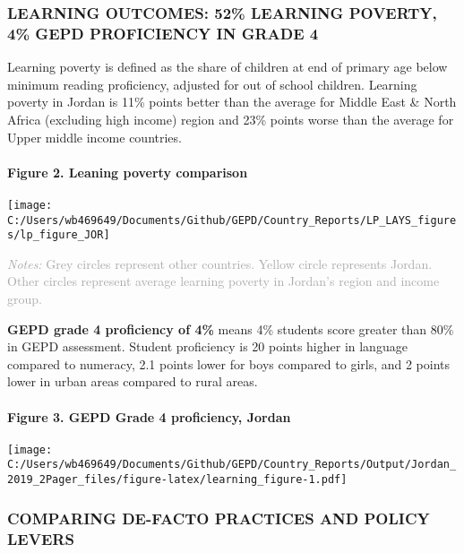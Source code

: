\documentclass[
  twocolumn]{article}
\begin{document}
\hypertarget{learning-outcomes-52-learning-poverty-4-gepd-proficiency-in-grade-4}{%
\subsubsection{\texorpdfstring{\textbf{LEARNING OUTCOMES: 52\% LEARNING
POVERTY, 4\% GEPD PROFICIENCY IN GRADE
4}}{LEARNING OUTCOMES: 52\% LEARNING POVERTY, 4\% GEPD PROFICIENCY IN GRADE 4}}\label{learning-outcomes-52-learning-poverty-4-gepd-proficiency-in-grade-4}}

Learning poverty is defined as the share of children at end of primary
age below minimum reading proficiency, adjusted for out of school
children. Learning poverty in Jordan is 11\% points better than the
average for Middle East \& North Africa (excluding high income) region
and 23\% points worse than the average for Upper middle income
countries.

\hypertarget{figure-2.-leaning-poverty-comparison}{%
\paragraph{Figure 2. Leaning poverty
comparison}\label{figure-2.-leaning-poverty-comparison}}

\texttt{[image: C:/Users/wb469649/Documents/Github/GEPD/Country\_Reports/LP\_LAYS\_figures/lp\_figure\_JOR]}

{\scriptsize
    \textcolor{darkgray}{\textit{Notes:} Grey circles represent other countries. Yellow circle represents Jordan. Other circles represent average learning poverty in Jordan's region and income group.}
  }

\textbf{GEPD grade 4 proficiency of 4\%} means 4\% students score
greater than 80\% in GEPD assessment. Student proficiency is 20 points
higher in language compared to numeracy, 2.1 points lower for boys
compared to girls, and 2 points lower in urban areas compared to rural
areas.

\hypertarget{figure-3.-gepd-grade-4-proficiency-jordan}{%
\paragraph{Figure 3. GEPD Grade 4 proficiency,
Jordan}\label{figure-3.-gepd-grade-4-proficiency-jordan}}

\texttt{[image: C:/Users/wb469649/Documents/Github/GEPD/Country\_Reports/Output/Jordan\_2019\_2Pager\_files/figure-latex/learning\_figure-1.pdf]}

\hypertarget{comparing-de-facto-practices-and-policy-levers}{%
\subsubsection{\texorpdfstring{\textbf{COMPARING DE-FACTO PRACTICES AND
POLICY
LEVERS}}{COMPARING DE-FACTO PRACTICES AND POLICY LEVERS}}\label{comparing-de-facto-practices-and-policy-levers}}
\end{document}
